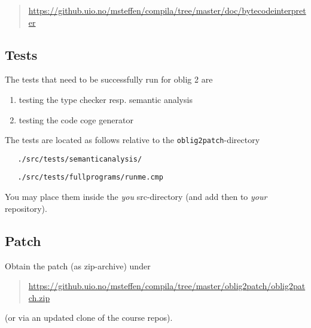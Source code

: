 \documentclass[11pt,freeform]{handout}[2014/08/13]
\begin{document}
\begin{quote}
  \url{https://github.uio.no/msteffen/compila/tree/master/doc/bytecodeinterpreter}
\end{quote}





\subsection*{Tests}
\label{sec:tests}

The tests that need to be successfully run for oblig 2 are
\begin{enumerate}
\item testing the type checker resp. semantic analysis
\item testing the code coge generator
\end{enumerate}


The tests are located as follows relative to the
\texttt{oblig2patch}-directory

\begin{verbatim}
   ./src/tests/semanticanalysis/
\end{verbatim}


\begin{verbatim}
   ./src/tests/fullprograms/runme.cmp
\end{verbatim}


You may place them inside the \emph{you} src-directory (and add then to
\emph{your} repository).

\subsection*{Patch}
\label{sec:patch}


Obtain the patch (as zip-archive) under 

\begin{quote}
  \url{https://github.uio.no/msteffen/compila/tree/master/oblig2patch/oblig2patch.zip}
\end{quote}

(or via an updated clone of the course repos).




%
% 




\end{document}
